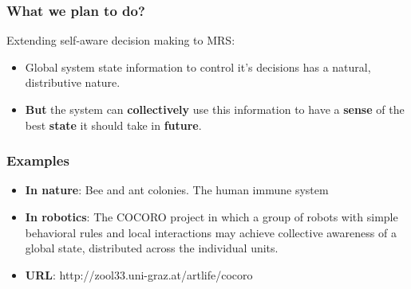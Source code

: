 \documentclass{beamer}
\begin{document}
	\begin{frame}
		\frametitle{What we plan to do?}
		Extending self-aware decision making to MRS:
		\begin{itemize}
			\item Global system state information to control it's decisions has a natural, distributive nature.
			\item \textbf{But} the system can \textbf{collectively} use this information to have a \textbf{sense} of the best \textbf{state} it should take in \textbf{future}.
		\end{itemize}	
	\end{frame}
	\begin{frame}
		\frametitle{Examples}
			\begin{itemize}
				\item \textbf{In nature}: Bee and ant colonies. The human immune system 
				\item \textbf{In robotics}: The COCORO project in which a group of robots with simple behavioral rules and local interactions may achieve collective awareness of a global state, distributed across the individual units.
				\item \textbf{URL}: http://zool33.uni-graz.at/artlife/cocoro
			\end{itemize}	
	\end{frame}
\end{document}
